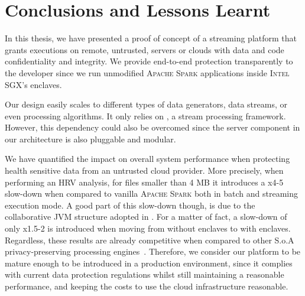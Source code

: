 \chapter{Conclusions and Lessons Learnt} \label{chap:conclusion}

In this thesis, we have presented a proof of concept of a streaming platform that grants executions on remote, untrusted, servers or clouds with data and code confidentiality and integrity. 
We provide end-to-end protection transparently to the developer since we run unmodified \textsc{Apache Spark} applications inside \textsc{Intel SGX}'s enclaves.

Our design easily scales to different types of data generators, data streams, or even processing algorithms.
It only relies on \sgxspark, a stream processing framework.
However, this dependency could also be overcomed since the server component in our architecture is also pluggable and modular.

We have quantified the impact on overall system performance when protecting health sensitive data from an untrusted cloud provider.
More precisely, when performing an HRV analysis, for files smaller than 4 MB it introduces a x4-5 slow-down when compared to vanilla \textsc{Apache Spark} both in batch and streaming execution mode. 
A good part of this slow-down though, is due to the collaborative JVM structure adopted in \sgxspark.
For a matter of fact, a slow-down of only x1.5-2 is introduced when moving from \sgxspark without enclaves to with enclaves.
Regardless, these results are already competitive when compared to other S.o.A privacy-preserving processing engines~\cite{Zheng2017}. 
Therefore, we consider our platform to be mature enough to be introduced in a production environment, since it complies with current data protection regulations whilst still maintaining a reasonable performance, and keeping the costs to use the cloud infrastructure reasonable.

